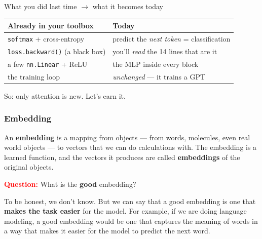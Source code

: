 \begin{frame}{What you did last time $\to$ what it becomes today}
  \begin{center}
  \renewcommand{\arraystretch}{1.4}
  \begin{tabular}{l@{\quad$\Rightarrow$\quad}l}
    \textbf{Already in your toolbox} & \textbf{Today} \\\hline
    \texttt{softmax} + cross-entropy & predict the \emph{next token} = classification \\
    \texttt{loss.backward()} (a black box) & you'll \emph{read} the 14 lines that are it \\
    a few \texttt{nn.Linear} + ReLU & the MLP inside every block \\
    the training loop & \emph{unchanged} — it trains a GPT \\
  \end{tabular}
  \end{center}
  \vfill
  \begin{center}\footnotesize So: only \alert{attention} is new. Let's earn it.\end{center}
\end{frame}

\begin{frame}
    \frametitle{Embedding}

    \begin{definition}[Embedding]
        An \textbf{embedding} is a mapping from objects --- from words, molecules, even real world objects --- to vectors that we can do calculations with. The embedding is a learned function, and the vectors it produces are called \textbf{embeddings} of the original objects.
    \end{definition}

    \pause

    \textcolor{red}{\textbf{Question:}} What is the \textbf{good} embedding?

    \pause

    To be honest, we don't know. But we can say that a good embedding is one that \textbf{makes the task easier} for the model. For example, if we are doing language modeling, a good embedding would be one that captures the meaning of words in a way that makes it easier for the model to predict the next word.
\end{frame}

